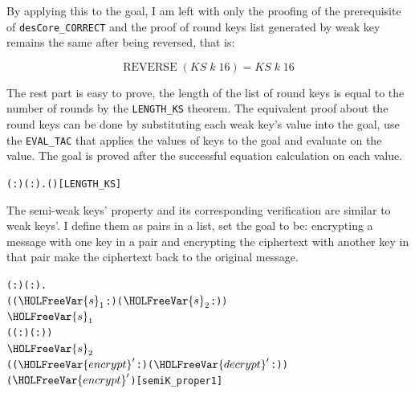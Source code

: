 \documentclass{article}
\begin{document}
By applying this to the goal, I am left with only the proofing of the prerequisite of \verb|desCore_CORRECT| and the
proof of round keys list generated by weak key remains the same after being reversed, that is:

\begin{equation*}
   \mathrm{REVERSE} \; (KS \; k \; 16) = KS \; k \; 16
\end{equation*}

The rest part is easy to prove, the length of the list of round keys is equal to the number of rounds by the \verb|LENGTH_KS|
theorem. The equivalent proof about the round keys can be done by substituting each weak key's value into the goal,
use the \verb|EVAL_TAC| that applies the values of keys to the goal and evaluate on the value. The goal is proved after
the successful equation calculation on each value.

\begin{alltt}
\HOLTokenTurnstile{} \HOLSymConst{\HOLTokenForall{}}( :) ( :).  (  ) \HOLSymConst{=} \hfill{[LENGTH_KS]}
\end{alltt}

The semi-weak keys' property and its corresponding verification are similar to weak keys'. I define them as pairs in a list,
set the goal to be: encrypting a message with one key in a pair and encrypting the ciphertext with another key
in that pair make the ciphertext back to the original message.

\begin{alltt}
\HOLTokenTurnstile{} \HOLSymConst{\HOLTokenForall{}}( :) ( : \HOLTokenProd{} ).
        \HOLSymConst{\HOLTokenConj{}}  \HOLSymConst{=} ((\ensuremath{\HOLFreeVar{s}\sb{\mathrm{1}}} :)\HOLSymConst{,}(\ensuremath{\HOLFreeVar{s}\sb{\mathrm{2}}} :)) \HOLSymConst{\HOLTokenConj{}}
      \ensuremath{\HOLFreeVar{s}\sb{\mathrm{1}}} \HOLSymConst{=}
     (( : \HOLTokenMap{} )\HOLSymConst{,}( : \HOLTokenMap{} )) \HOLSymConst{\HOLTokenConj{}}
      \ensuremath{\HOLFreeVar{s}\sb{\mathrm{2}}} \HOLSymConst{=}
     ((\ensuremath{\HOLFreeVar{encrypt}\sp{\prime{}}} : \HOLTokenMap{} )\HOLSymConst{,}(\ensuremath{\HOLFreeVar{decrypt}\sp{\prime{}}} : \HOLTokenMap{} )) \HOLSymConst{\HOLTokenImp{}}
      (\ensuremath{\HOLFreeVar{encrypt}\sp{\prime{}}} ) \HOLSymConst{=} \hfill{[semiK_proper1]}
\end{alltt}
\end{document}
